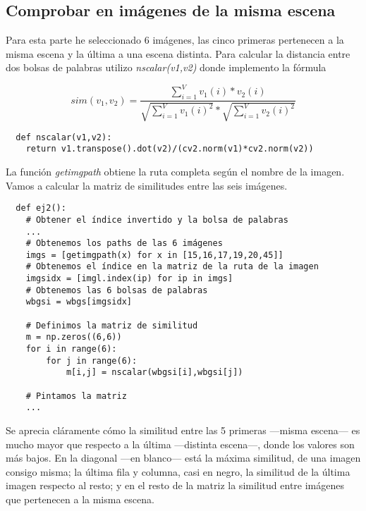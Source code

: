 \documentclass{article}
\newcommand{\img}[2]{
\noindent\makebox[\textwidth][c]{\texttt{[image: imgs/\#1]}}%
}
\begin{document}
\subsection{Comprobar en imágenes de la misma escena}

Para esta parte he seleccionado 6 imágenes, las cinco primeras pertenecen a la misma escena y la última a una escena distinta. Para calcular la distancia entre dos bolsas de palabras utilizo \textit{nscalar(v1,v2)} donde implemento la fórmula

\[ sim(v_1,v_2) = \frac{\sum_{i=1}^V v_1(i)*v_2(i)}{\sqrt{\sum_{i=1}^Vv_1(i)^2}*\sqrt{\sum_{i=1}^Vv_2(i)^2}}\]

\begin{verbatim}
  def nscalar(v1,v2):
    return v1.transpose().dot(v2)/(cv2.norm(v1)*cv2.norm(v2))
\end{verbatim}

La función \textit{getimgpath} obtiene la ruta completa según el nombre de la imagen. Vamos a calcular la matriz de similitudes entre las seis imágenes.

\begin{verbatim}
  def ej2():
    # Obtener el índice invertido y la bolsa de palabras
    ...
    # Obtenemos los paths de las 6 imágenes
    imgs = [getimgpath(x) for x in [15,16,17,19,20,45]]
    # Obtenemos el índice en la matriz de la ruta de la imagen
    imgsidx = [imgl.index(ip) for ip in imgs]
    # Obtenemos las 6 bolsas de palabras
    wbgsi = wbgs[imgsidx]
    
    # Definimos la matriz de similitud
    m = np.zeros((6,6))
    for i in range(6):
        for j in range(6):
            m[i,j] = nscalar(wbgsi[i],wbgsi[j])
    
    # Pintamos la matriz
    ...
\end{verbatim}

\img{ej2_1}{0.5}

Se aprecia cláramente cómo la similitud entre las 5 primeras ---misma escena--- es mucho mayor que respecto a la última ---distinta escena---, donde los valores son más bajos. En la diagonal ---en blanco--- está la máxima similitud, de una imagen consigo misma; la última fila y columna, casi en negro, la similitud de la última imagen respecto al resto; y en el resto de la matriz la similitud entre imágenes que pertenecen a la misma escena.
\end{document}
